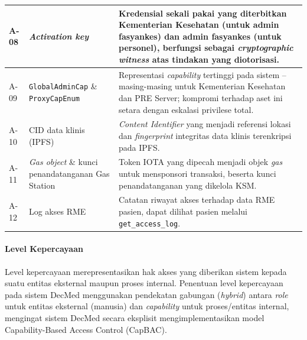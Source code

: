 \begin{xltabular}{\textwidth}{|>{\centering\arraybackslash}p{1.2cm}|>{\raggedright\arraybackslash}p{3.5cm}|X|}
    A-08 & \textit{Activation key} & Kredensial sekali pakai yang diterbitkan Kementerian Kesehatan (untuk admin fasyankes) dan admin fasyankes (untuk personel), berfungsi sebagai \textit{cryptographic witness} atas tindakan yang diotorisasi. \\
    \hline

    A-09 & \texttt{GlobalAdminCap} \& \texttt{ProxyCapEnum} & Representasi \textit{capability} tertinggi pada sistem -- masing-masing untuk Kementerian Kesehatan dan PRE Server; kompromi terhadap aset ini setara dengan eskalasi privilese total. \\
    \hline

    A-10 & CID data klinis (IPFS) & \textit{Content Identifier} yang menjadi referensi lokasi dan \textit{fingerprint} integritas data klinis terenkripsi pada IPFS. \\
    \hline

    A-11 & \textit{Gas object} \& kunci penandatanganan Gas Station & Token IOTA yang dipecah menjadi objek \textit{gas} untuk mensponsori transaksi, beserta kunci penandatanganan yang dikelola KSM. \\
    \hline

    A-12 & Log akses RME & Catatan riwayat akses terhadap data RME pasien, dapat dilihat pasien melalui \texttt{get\_access\_log}. \\
    \hline

\end{xltabular}

\paragraph{Level Kepercayaan}

Level kepercayaan merepresentasikan hak akses yang diberikan sistem kepada suatu entitas eksternal maupun proses internal. Penentuan level kepercayaan pada sistem DecMed menggunakan pendekatan gabungan (\textit{hybrid}) antara \textit{role} untuk entitas eksternal (manusia) dan \textit{capability} untuk proses/entitas internal, mengingat sistem DecMed secara eksplisit mengimplementasikan model Capability-Based Access Control (CapBAC).

